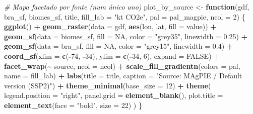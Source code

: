 \documentclass[
]{article}
\newenvironment{Shaded}{\begin{snugshade}}{\end{snugshade}}
\newcommand{\AttributeTok}[1]{\textcolor[rgb]{0.13,0.29,0.53}{#1}}
\newcommand{\CommentTok}[1]{\textcolor[rgb]{0.56,0.35,0.01}{\textit{#1}}}
\newcommand{\ConstantTok}[1]{\textcolor[rgb]{0.56,0.35,0.01}{#1}}
\newcommand{\ControlFlowTok}[1]{\textcolor[rgb]{0.13,0.29,0.53}{\textbf{#1}}}
\newcommand{\DecValTok}[1]{\textcolor[rgb]{0.00,0.00,0.81}{#1}}
\newcommand{\FloatTok}[1]{\textcolor[rgb]{0.00,0.00,0.81}{#1}}
\newcommand{\FunctionTok}[1]{\textcolor[rgb]{0.13,0.29,0.53}{\textbf{#1}}}
\newcommand{\NormalTok}[1]{#1}
\newcommand{\OtherTok}[1]{\textcolor[rgb]{0.56,0.35,0.01}{#1}}
\newcommand{\SpecialCharTok}[1]{\textcolor[rgb]{0.81,0.36,0.00}{\textbf{#1}}}
\newcommand{\StringTok}[1]{\textcolor[rgb]{0.31,0.60,0.02}{#1}}
\begin{document}
\begin{Shaded}
\begin{Highlighting}[]
\CommentTok{\# Mapa facetado por fonte (num único ano)}
\NormalTok{plot\_by\_source }\OtherTok{\textless{}{-}} \ControlFlowTok{function}\NormalTok{(gdf, bra\_sf, biomes\_sf, title, }\AttributeTok{fill\_lab =} \StringTok{"kt CO2e"}\NormalTok{, }\AttributeTok{pal =}\NormalTok{ pal\_magpie, }\AttributeTok{ncol =} \DecValTok{2}\NormalTok{) \{}
  \FunctionTok{ggplot}\NormalTok{() }\SpecialCharTok{+}
    \FunctionTok{geom\_raster}\NormalTok{(}\AttributeTok{data =}\NormalTok{ gdf, }\FunctionTok{aes}\NormalTok{(lon, lat, }\AttributeTok{fill =}\NormalTok{ value)) }\SpecialCharTok{+}
    \FunctionTok{geom\_sf}\NormalTok{(}\AttributeTok{data =}\NormalTok{ biomes\_sf, }\AttributeTok{fill =} \ConstantTok{NA}\NormalTok{, }\AttributeTok{color =} \StringTok{"grey35"}\NormalTok{, }\AttributeTok{linewidth =} \FloatTok{0.25}\NormalTok{) }\SpecialCharTok{+}
    \FunctionTok{geom\_sf}\NormalTok{(}\AttributeTok{data =}\NormalTok{ bra\_sf,    }\AttributeTok{fill =} \ConstantTok{NA}\NormalTok{, }\AttributeTok{color =} \StringTok{"grey15"}\NormalTok{, }\AttributeTok{linewidth =} \FloatTok{0.4}\NormalTok{) }\SpecialCharTok{+}
    \FunctionTok{coord\_sf}\NormalTok{(}\AttributeTok{xlim =} \FunctionTok{c}\NormalTok{(}\SpecialCharTok{{-}}\DecValTok{74}\NormalTok{, }\SpecialCharTok{{-}}\DecValTok{34}\NormalTok{), }\AttributeTok{ylim =} \FunctionTok{c}\NormalTok{(}\SpecialCharTok{{-}}\DecValTok{34}\NormalTok{, }\DecValTok{6}\NormalTok{), }\AttributeTok{expand =} \ConstantTok{FALSE}\NormalTok{) }\SpecialCharTok{+}
    \FunctionTok{facet\_wrap}\NormalTok{(}\SpecialCharTok{\textasciitilde{}}\NormalTok{ source, }\AttributeTok{ncol =}\NormalTok{ ncol) }\SpecialCharTok{+}
    \FunctionTok{scale\_fill\_gradientn}\NormalTok{(}\AttributeTok{colors =}\NormalTok{ pal, }\AttributeTok{name =}\NormalTok{ fill\_lab) }\SpecialCharTok{+}
    \FunctionTok{labs}\NormalTok{(}\AttributeTok{title =}\NormalTok{ title, }\AttributeTok{caption =} \StringTok{"Source: MAgPIE / Default version (SSP2)"}\NormalTok{) }\SpecialCharTok{+}
    \FunctionTok{theme\_minimal}\NormalTok{(}\AttributeTok{base\_size =} \DecValTok{12}\NormalTok{) }\SpecialCharTok{+}
    \FunctionTok{theme}\NormalTok{(}
      \AttributeTok{legend.position =} \StringTok{"right"}\NormalTok{,}
      \AttributeTok{panel.grid      =} \FunctionTok{element\_blank}\NormalTok{(),}
      \AttributeTok{plot.title      =} \FunctionTok{element\_text}\NormalTok{(}\AttributeTok{face =} \StringTok{"bold"}\NormalTok{, }\AttributeTok{size =} \DecValTok{22}\NormalTok{)}
\NormalTok{    )}
\NormalTok{\}}
\end{Highlighting}
\end{Shaded}
\end{document}
